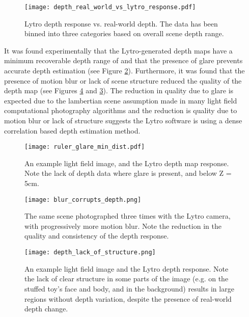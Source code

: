 \begin{figure}[h]
\centering
\caption[Lytro depth response vs. real-world depth]{Lytro depth response vs. real-world depth. The data has been binned into three categories based on overall scene depth range.}
\label{fig:depth_real_world_vs_lytro_response}
\texttt{[image: depth\_real\_world\_vs\_lytro\_response.pdf]}
\end{figure}

It was found experimentally that the Lytro-generated depth maps have a minimum recoverable depth range of  and that the presence of glare prevents accurate depth estimation (see Figure \ref{fig:ruler_glare_min_dist}).
Furthermore, it was found that the presence of motion blur or lack of scene structure reduced the quality of the depth map (see Figures \ref{fig:depth_lack_of_structure} and \ref{fig:blur_corrupts_depth}).
The reduction in quality due to glare is expected due to the lambertian scene assumption made in many light field computational photography algorithms \cite{bishop2009light, liang2011light, baker2003shape} and the reduction is quality due to motion blur or lack of structure suggests the Lytro software is using a dense correlation based depth estimation method.


\begin{figure}
\centering
\texttt{[image: ruler\_glare\_min\_dist.pdf]}
\caption[Minimum depth map distance and the effect of glare]{An example light field image, and the Lytro depth map response. Note the lack of depth data where glare is present, and below Z = 5cm.}
\label{fig:ruler_glare_min_dist}
\end{figure}

\begin{figure}
\centering
\texttt{[image: blur\_corrupts\_depth.png]}
\caption[Motion Blur Corrupts Lytro Depth Estimation]{The same scene photographed three times with the Lytro camera, with progressively more motion blur. Note the reduction in the quality and consistency of the depth response.}
\label{fig:blur_corrupts_depth}
\end{figure}

\begin{figure}
\centering
\texttt{[image: depth\_lack\_of\_structure.png]}
\caption[Lack of Scene Structure Corrupts Lytro Depth Estimation]{An example light field image and the Lytro depth response. Note the lack of clear structure in some parts of the image (e.g. on the stuffed toy's face and body, and in the background) results in large regions without depth variation, despite the presence of real-world depth change.}
\label{fig:depth_lack_of_structure}
\end{figure}

